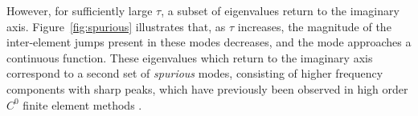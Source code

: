 \documentclass[10pt]{article}
\begin{document}
However, for sufficiently large $\tau$, a subset of eigenvalues return to the imaginary axis.  Figure~\ref{fig:spurious} illustrates that, as $\tau$ increases, the magnitude of the inter-element jumps present in these modes decreases, and the mode approaches a continuous function.  These eigenvalues which return to the imaginary axis correspond to a second set of \emph{spurious} modes, consisting of higher frequency components with sharp peaks, which have previously been observed in high order $C^0$ finite element methods \cite{ainsworth2014dispersive,hughes2014finite}.  

\begin{figure}
\centering
{}
\hspace{.5em}
\hspace{.5em}
\\

\end{figure}
\end{document}
